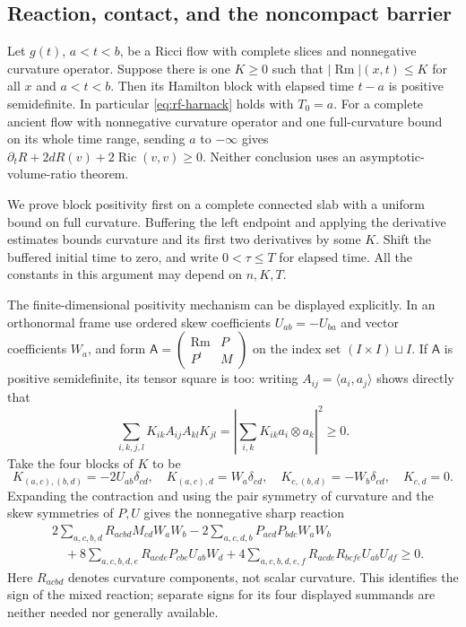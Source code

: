 \subsection{Reaction, contact, and the noncompact barrier}

\begin{proposition}\label{prop:rf-bounded-harnack}
Let $g(t)$, $a<t<b$, be a Ricci flow with complete slices and
nonnegative curvature operator.  Suppose there is one $K\geq0$ such
that $|\operatorname{Rm}|(x,t)\leq K$ for all $x$ and $a<t<b$.
Then its Hamilton block with elapsed time $t-a$ is positive semidefinite.
In particular \eqref{eq:rf-harnack} holds with $T_0=a$.
For a complete ancient flow with nonnegative curvature operator and
one full-curvature bound on its whole time range, sending $a$ to
$-\infty$ gives
$\partial_tR+2dR(v)+2\operatorname{Ric}(v,v)\geq0$.
Neither conclusion uses an asymptotic-volume-ratio theorem.
\end{proposition}

We prove block positivity first on a complete connected slab with a
uniform bound on full curvature.  Buffering the left endpoint and
applying the derivative estimates bounds curvature and its first two
derivatives by some $K$.  Shift the buffered initial time to zero, and
write $0<\tau\leq T$ for elapsed time.  All the constants in this
argument may depend on $n,K,T$.

The finite-dimensional positivity mechanism can be displayed explicitly.
In an orthonormal frame use ordered skew coefficients $U_{ab}=-U_{ba}$
and vector coefficients $W_a$, and form
$\mathsf A=\left(\begin{smallmatrix}\operatorname{Rm}&P\\P^t&M\end{smallmatrix}\right)$
on the index set $(I\times I)\sqcup I$.
If $\mathsf A$ is positive semidefinite, its tensor square is too:
writing $A_{ij}=\langle a_i,a_j\rangle$ shows directly that
\[
 \sum_{i,k,j,l}K_{ik}A_{ij}A_{kl}K_{jl}
            =\left|\sum_{i,k}K_{ik}a_i\otimes a_k\right|^2\geq0.
\]
Take the four blocks of $K$ to be
\[
 K_{(a,c),(b,d)}=-2U_{ab}\delta_{cd},\quad
 K_{(a,c),d}=W_a\delta_{cd},\quad
 K_{c,(b,d)}=-W_b\delta_{cd},\quad K_{c,d}=0.
\]
Expanding the contraction and using the pair symmetry of curvature and
the skew symmetries of $P,U$ gives the nonnegative sharp reaction
\begin{equation}\label{eq:rf-harnack-sharp}
\begin{split}
 &2\sum_{a,c,b,d}R_{acbd}M_{cd}W_aW_b
 -2\sum_{a,c,d,b}P_{acd}P_{bdc}W_aW_b\\
 &\quad+8\sum_{a,c,b,d,e}R_{acde}P_{cbe}U_{ab}W_d
 +4\sum_{a,c,b,d,e,f}R_{acde}R_{bcfe}U_{ab}U_{df}\geq0.
\end{split}
\end{equation}
Here $R_{acbd}$ denotes curvature components, not scalar curvature.
This identifies the sign of the mixed reaction; separate signs for
its four displayed summands are neither needed nor generally available.

